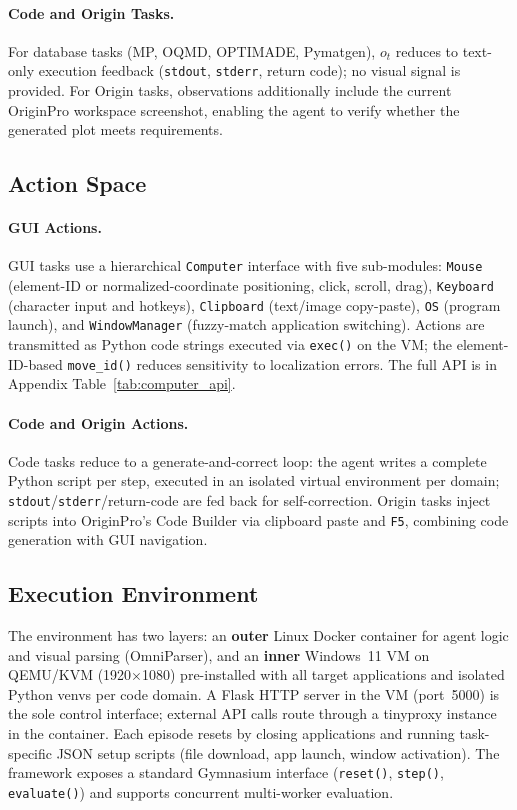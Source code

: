 \documentclass{article}
\begin{document}
\paragraph{Code and Origin Tasks.}
For database tasks (MP, OQMD, OPTIMADE, Pymatgen), $o_t$ reduces to text-only execution
feedback (\texttt{stdout}, \texttt{stderr}, return code); no visual signal is provided.
For Origin tasks, observations additionally include the current OriginPro workspace
screenshot, enabling the agent to verify whether the generated plot meets requirements.

\subsection{Action Space}

\paragraph{GUI Actions.}
GUI tasks use a hierarchical \texttt{Computer} interface with five sub-modules:
\texttt{Mouse} (element-ID or normalized-coordinate positioning, click, scroll, drag),
\texttt{Keyboard} (character input and hotkeys),
\texttt{Clipboard} (text/image copy-paste),
\texttt{OS} (program launch), and
\texttt{WindowManager} (fuzzy-match application switching).
Actions are transmitted as Python code strings executed via \texttt{exec()} on the VM;
the element-ID-based \texttt{move\_id()} reduces sensitivity to localization errors.
The full API is in Appendix Table~\ref{tab:computer_api}.

\paragraph{Code and Origin Actions.}
Code tasks reduce to a generate-and-correct loop: the agent writes a complete Python
script per step, executed in an isolated virtual environment per domain;
\texttt{stdout}/\texttt{stderr}/return-code are fed back for self-correction.
Origin tasks inject scripts into OriginPro's Code Builder via clipboard paste and \texttt{F5},
combining code generation with GUI navigation.

\subsection{Execution Environment}
The environment has two layers: an \textbf{outer} Linux Docker container for agent logic and
visual parsing (OmniParser), and an \textbf{inner} Windows~11 VM on QEMU/KVM
(1920$\times$1080) pre-installed with all target applications and isolated Python venvs per
code domain. A Flask HTTP server in the VM (port~5000) is the sole control interface;
external API calls route through a tinyproxy instance in the container.
Each episode resets by closing applications and running task-specific JSON setup scripts
(file download, app launch, window activation).
The framework exposes a standard Gymnasium interface (\texttt{reset()}, \texttt{step()},
\texttt{evaluate()}) and supports concurrent multi-worker evaluation.
\end{document}

